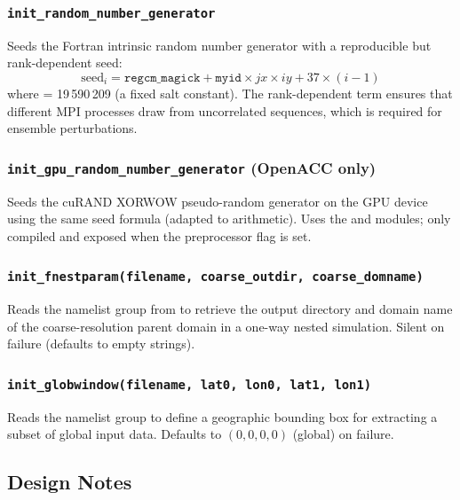\subsubsection{\texttt{init\_random\_number\_generator}}

Seeds the Fortran intrinsic random number generator with a reproducible but
rank-dependent seed:
\[
  \text{seed}_i = \texttt{regcm\_magick} + \texttt{myid} \times jx \times iy
                + 37 \times (i-1)
\]
where  = 19\,590\,209 (a fixed salt constant). The
rank-dependent term ensures that different MPI processes draw from
uncorrelated sequences, which is required for ensemble perturbations.

\subsubsection{\texttt{init\_gpu\_random\_number\_generator} (OpenACC only)}

Seeds the cuRAND XORWOW pseudo-random generator on the GPU device using the
same seed formula (adapted to  arithmetic). Uses the 
and  modules; only compiled and exposed when the
 preprocessor flag is set.

\subsubsection{\texttt{init\_fnestparam(filename, coarse\_outdir, coarse\_domname)}}

Reads the  namelist group from  to retrieve
the output directory and domain name of the coarse-resolution parent domain
in a one-way nested simulation. Silent on failure (defaults to empty strings).

\subsubsection{\texttt{init\_globwindow(filename, lat0, lon0, lat1, lon1)}}

Reads the  namelist group to define a geographic bounding
box for extracting a subset of global input data. Defaults to
$(0, 0, 0, 0)$ (global) on failure.

\subsection{Design Notes}
\label{subsec:dynparam_design}


